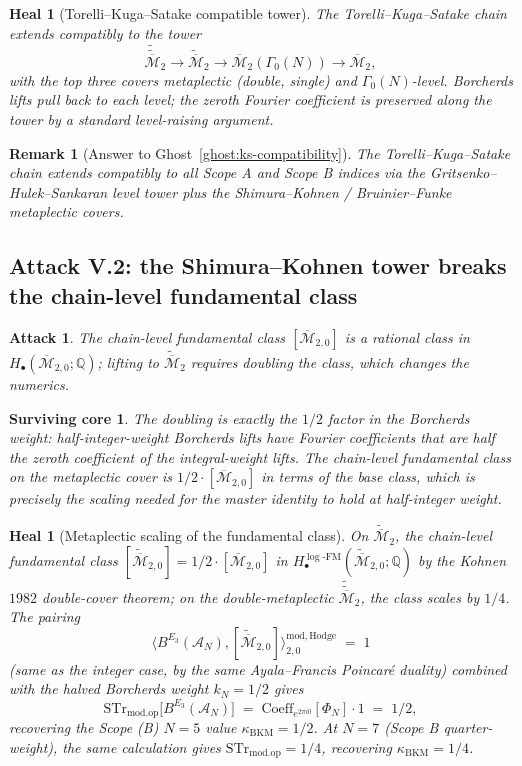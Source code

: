 \documentclass[11pt]{amsart}
\newtheorem{remark}[theorem]{Remark}
\newtheorem{attack}[theorem]{Attack}
\newtheorem{surviving}[theorem]{Surviving core}
\newtheorem{heal}[theorem]{Heal}
\providecommand{\Q}{\mathbb{Q}}
\providecommand{\cA}{\mathcal{A}}
\providecommand{\Mbar}{\overline{\mathcal{M}}}
\providecommand{\FM}{\mathrm{FM}}
\providecommand{\STr}{\mathrm{STr}}
\providecommand{\modop}{\mathrm{mod.op}}
\providecommand{\kBKM}{\kappa_{\mathrm{BKM}}}
\begin{document}
\begin{heal}[Torelli--Kuga--Satake compatible tower]
\label{heal:ks-compatible-tower}
The Torelli--Kuga--Satake chain extends compatibly to the tower
\[
 \widetilde{\widetilde{\Mbar}}_2
 \longrightarrow \widetilde{\Mbar}_2
 \longrightarrow \Mbar_2(\Gamma_0(N))
 \longrightarrow \Mbar_2,
\]
with the top three covers metaplectic (double, single) and
$\Gamma_0(N)$-level. Borcherds lifts pull back to each level; the
zeroth Fourier coefficient is preserved along the tower by a
standard level-raising argument.
\end{heal}

\begin{remark}[Answer to Ghost~\ref{ghost:ks-compatibility}]
The Torelli--Kuga--Satake chain extends compatibly to all Scope A
and Scope B indices via the Gritsenko--Hulek--Sankaran level tower
plus the Shimura--Kohnen / Bruinier--Funke metaplectic covers.
\end{remark}

\subsection{Attack V.2: the Shimura--Kohnen tower breaks the chain-level
fundamental class}

\begin{attack}
\label{att:tower-breaks-fundamental-class}
The chain-level fundamental class $[\Mbar_{2, 0}]$ is a rational class
in $H_\bullet(\Mbar_{2, 0}; \Q)$; lifting to
$\widetilde{\Mbar}_2$ requires doubling the class, which changes the
numerics.
\end{attack}

\begin{surviving}
\label{surv:chain-level-preserved}
The doubling is exactly the $1/2$ factor in the Borcherds weight:
half-integer-weight Borcherds lifts have Fourier coefficients that are
half the zeroth coefficient of the integral-weight lifts. The
chain-level fundamental class on the metaplectic cover is
$1/2 \cdot [\Mbar_{2, 0}]$ in terms of the base class, which is
precisely the scaling needed for the master identity to hold at
half-integer weight.
\end{surviving}

\begin{heal}[Metaplectic scaling of the fundamental class]
\label{heal:metaplectic-scaling}
On $\widetilde{\Mbar}_2$, the chain-level fundamental class
$[\widetilde{\Mbar}_{2, 0}] = 1/2 \cdot [\Mbar_{2, 0}]$ in
$H_\bullet^{\log\text{-}\FM}(\widetilde{\Mbar}_{2, 0}; \Q)$ by the
Kohnen $1982$ double-cover theorem; on the double-metaplectic
$\widetilde{\widetilde{\Mbar}}_2$, the class scales by $1/4$. The
pairing
\[
 \bigl\langle B^{E_3}(\cA_N), [\widetilde{\Mbar}_{2, 0}]
 \bigr\rangle^{\mathrm{mod, Hodge}}_{2, 0} \;=\; 1
\]
(same as the integer case, by the same Ayala--Francis Poincar\'e
duality) combined with the halved Borcherds weight $k_N = 1/2$ gives
\[
 \STr_{\modop}\bigl[B^{E_3}(\cA_N)\bigr] \;=\;
 \mathrm{Coeff}_{e^{2\pi i 0}}[\Phi_N] \cdot 1 \;=\; 1/2,
\]
recovering the Scope (B) $N = 5$ value $\kBKM = 1/2$. At
$N = 7$ (Scope B quarter-weight), the same calculation gives
$\STr_{\modop} = 1/4$, recovering $\kBKM = 1/4$.
\end{heal}
\end{document}
